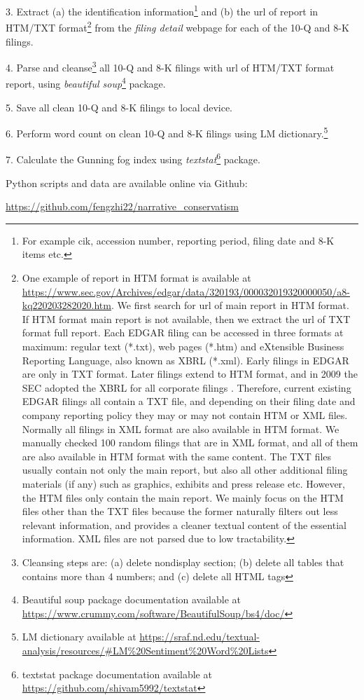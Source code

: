 3. Extract (a) the identification information\footnote{For example cik, accession number, reporting period, filing date and 8-K items etc.} and (b) the url of report in HTM/TXT format\footnote{One example of report in HTM format is available at \url{https://www.sec.gov/Archives/edgar/data/320193/000032019320000050/a8-kq220203282020.htm}. We first search for url of main report in HTM format. If HTM format main report is not available, then we extract the url of TXT format full report. Each EDGAR filing can be accessed in three formats at maximum: regular text (*.txt), web pages (*.htm) and eXtensible Business Reporting Language, also known as XBRL (*.xml). Early filings in EDGAR are only in TXT format. Later filings extend to HTM format, and in 2009 the SEC adopted the XBRL for all corporate filings \cite{secFinalRuleInteractive2009}. Therefore, current existing EDGAR filings all contain a TXT file, and depending on their filing date and company reporting policy they may or may not contain HTM or XML files. Normally all filings in XML format are also available in HTM format. We manually checked 100 random filings that are in XML format, and all of them are also available in HTM format with the same content. The TXT files usually contain not only the main report, but also all other additional filing materials (if any) such as graphics, exhibits and press release etc. However, the HTM files only contain the main report. We mainly focus on the HTM files other than the TXT files because the former naturally filters out less relevant information, and provides a cleaner textual content of the essential information. XML files are not parsed due to low tractability. } from the \textit{filing detail} webpage for each of the 10-Q and 8-K filings. 

4. Parse and cleanse\footnote{Cleansing steps are: (a) delete nondisplay section; (b) delete all tables that contains more than 4 numbers; and (c) delete all HTML tags} all 10-Q and 8-K filings with url of HTM/TXT format report, using \textit{beautiful soup}\footnote{Beautiful soup package documentation available at \url{https://www.crummy.com/software/BeautifulSoup/bs4/doc/}} package. 

5. Save all clean 10-Q and 8-K filings to local device. 

6. Perform word count on clean 10-Q and 8-K filings using LM dictionary.\footnote{LM dictionary available at \url{https://sraf.nd.edu/textual-analysis/resources/\#LM\%20Sentiment\%20Word\%20Lists}}

7. Calculate the Gunning fog index using \textit{textstat}\footnote{textstat package documentation available at \url{https://github.com/shivam5992/textstat}} package. 
\newline

Python scripts and data are available online via Github:

\url{https://github.com/fengzhi22/narrative_conservatism}